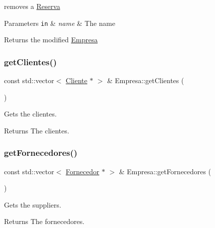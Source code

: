 removes a \hyperlink{classReserva}{Reserva} 


\begin{DoxyParams}[1]{Parameters}
\mbox{\tt in}  & {\em name} & The name\\
\hline
\end{DoxyParams}
\begin{DoxyReturn}{Returns}
the modified \hyperlink{classEmpresa}{Empresa} 
\end{DoxyReturn}
\mbox{\label{classEmpresa_a472beae89ee1187e1ec3f70e9d4a99ef}} 
\subsubsection{\texorpdfstring{get\+Clientes()}{getClientes()}}
{\footnotesize\ttfamily const std\+::vector$<$ \hyperlink{classCliente}{Cliente} $\ast$ $>$ \& Empresa\+::get\+Clientes (\begin{DoxyParamCaption}{ }\end{DoxyParamCaption})}



Gets the clientes. 

\begin{DoxyReturn}{Returns}
The clientes. 
\end{DoxyReturn}
\mbox{\label{classEmpresa_aaf131a375aa70819205744328a4dbc07}} 
\subsubsection{\texorpdfstring{get\+Fornecedores()}{getFornecedores()}}
{\footnotesize\ttfamily const std\+::vector$<$ \hyperlink{classFornecedor}{Fornecedor} $\ast$ $>$ \& Empresa\+::get\+Fornecedores (\begin{DoxyParamCaption}{ }\end{DoxyParamCaption})}



Gets the suppliers. 

\begin{DoxyReturn}{Returns}
The fornecedores. 
\end{DoxyReturn}
\mbox{\label{classEmpresa_a2e8e13ecd162403da0118ceccdccbbcb}} 
